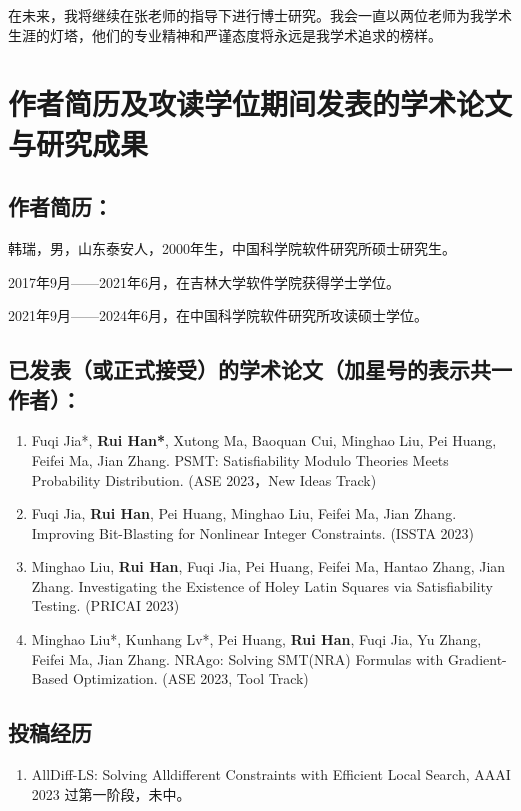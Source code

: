 在未来，我将继续在张老师的指导下进行博士研究。我会一直以两位老师为我学术生涯的灯塔，他们的专业精神和严谨态度将永远是我学术追求的榜样。

\chapter{作者简历及攻读学位期间发表的学术论文与研究成果}

\section*{作者简历：}

韩瑞，男，山东泰安人，2000年生，中国科学院软件研究所硕士研究生。

2017年9月——2021年6月，在吉林大学软件学院获得学士学位。

2021年9月——2024年6月，在中国科学院软件研究所攻读硕士学位。

\section*{已发表（或正式接受）的学术论文（加星号的表示共一作者）：}

{
\setlist[enumerate]{}%
\begin{enumerate}[nosep]
    \item Fuqi Jia*, \textbf{Rui Han*}, Xutong Ma, Baoquan Cui, Minghao Liu, Pei Huang, Feifei Ma, Jian Zhang. PSMT: Satisfiability Modulo Theories Meets Probability Distribution. (ASE 2023，New Ideas Track)
    \item Fuqi Jia, \textbf{Rui Han}, Pei Huang, Minghao Liu, Feifei Ma, Jian Zhang. Improving Bit-Blasting for Nonlinear Integer Constraints. (ISSTA 2023)
    \item Minghao Liu, \textbf{Rui Han}, Fuqi Jia, Pei Huang, Feifei Ma, Hantao Zhang, Jian Zhang. Investigating the Existence of Holey Latin Squares via Satisfiability Testing. (PRICAI 2023)
    \item Minghao Liu*, Kunhang Lv*, Pei Huang, \textbf{Rui Han}, Fuqi Jia, Yu Zhang, Feifei Ma, Jian Zhang. NRAgo: Solving SMT(NRA) Formulas with Gradient-Based Optimization. (ASE 2023, Tool Track)
\end{enumerate}
}

\section*{投稿经历}

{
\setlist[enumerate]{}%
\begin{enumerate}[nosep]
    \item AllDiff-LS: Solving Alldifferent Constraints with Efficient Local Search, AAAI 2023 过第一阶段，未中。
\end{enumerate}
}

